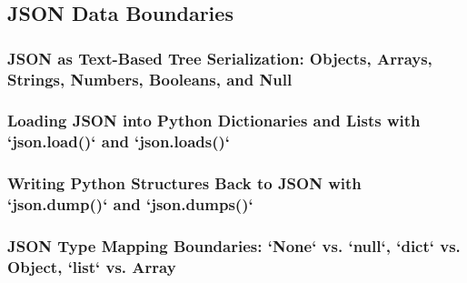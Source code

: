 \subsection{JSON Data Boundaries}
\subsubsection{JSON as Text-Based Tree Serialization: Objects, Arrays, Strings, Numbers, Booleans, and Null}
\subsubsection{Loading JSON into Python Dictionaries and Lists with `json.load()` and `json.loads()`}
\subsubsection{Writing Python Structures Back to JSON with `json.dump()` and `json.dumps()`}
\subsubsection{JSON Type Mapping Boundaries: `None` vs. `null`, `dict` vs. Object, `list` vs. Array}
